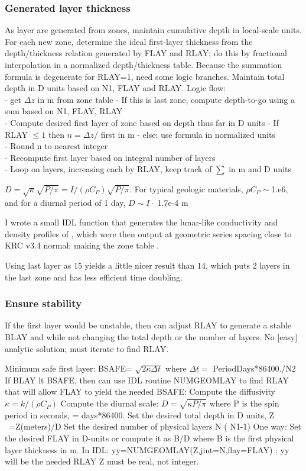 \documentclass{article}
\begin{document}
\subsubsection{Generated layer thickness}
As layer are generated from zones, maintain cumulative depth in local-scale
units. For each new zone, determine the ideal first-layer thickness from the
depth/thickness relation generated by FLAY and RLAY; do this by fractional
interpolation in a normalized depth/thickness table. Because the summation
formula is degenerate for RLAY=1, need some logic branches. Maintain total depth
in D units based on N1, FLAY and RLAY. Logic flow:
\\ - get $\Delta z$ in m from zone table
\qi -  If this is last zone, compute depth-to-go using a sum based on N1, FLAY, RLAY
\\ - Compute desired first layer of zone based on depth thus far in D units
\qi - If RLAY $\leq 1$ then $n=\Delta z /$ first in m 
\qi - else: use formula in normalized units
\\ - Round n to nearest integer
\\ - Recompute first layer based on integral number of layers
\\ - Loop on layers, increasing each by RLAY, keep track of $\sum$ in m and D units

$D=\sqrt{\kappa}\sqrt{P/\pi} = I/(\rho C_P)\sqrt{P/\pi}$.
\qi For typical geologic materials, $\rho C_P \sim $1.e6, and for a diurnal
period of 1 day, $D \sim I \cdot $ 1.7e-4 m

 I wrote a small IDL function that generates the
lunar-like conductivity and density profiles of , which were then
output at geometric series spacing close to KRC v3.4 normal; making the zone
table .

Using last layer as 15 yields a little nicer result than 14, which puts 2
layers in the last zone and has less efficient time doubling.

\subsubsection{Ensure stability}%

If the first layer would be unstable, then can adjust RLAY to generate a stable
BLAY and while not changing the total depth or the number of layers. No [easy]
analytic solution; must iterate to find RLAY.

Minimum safe first layer: BSAFE= $\sqrt{2 \kappa \Delta t }$ where $\Delta t = $ PeriodDays*86400./N2   If BLAY lt BSAFE, then can use IDL 
routine NUMGEOMLAY to find RLAY that will allow FLAY to yield the needed BSAFE:
\qi Compute the diffusivity $\kappa = k/( \rho C_P)$
\qi Compute the diurnal scale: $D=\sqrt{ \kappa P/\pi}$ where P is the spin period in seconds, = days*86400.
\qi Set the desired total depth in D units, Z \ =Z(meters)/D
\qi Set the desired number of physical layers N ( N1-1)
\qii One way: 
\qi Set the desired FLAY in D-units or compute it as B/D where B is the first physical layer thickness in m.
\qi In IDL: yy=NUMGEOMLAY(Z,jint=N,flay=FLAY)  ; yy will be the needed RLAY
\qiii Z must be real, not integer.
\end{document}

